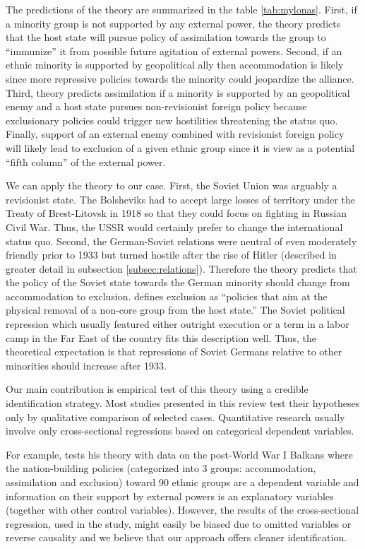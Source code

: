 The predictions of the theory are summarized in the table \ref{tab:mylonas}. First, if a minority group is not supported by any external power, the theory predicts that the host state will pursue policy of assimilation towards the group to \enquote{immunize} it from possible future  agitation  of external powers. Second, if an ethnic minority is supported by geopolitical ally then accommodation is likely since more repressive policies towards the minority could jeopardize the alliance. Third, theory predicts assimilation if a minority is supported by an geopolitical enemy and a host state pursues non-revisionist foreign policy because exclusionary policies could trigger new hostilities threatening the status quo. 
Finally, support of an external enemy combined with revisionist foreign policy will likely lead to exclusion of a given ethnic group since it is view as a potential \enquote{fifth column} of the external power. 



We can apply the theory to our case. First, the Soviet Union was arguably a revisionist state. The Bolsheviks had to accept large losses of territory under the Treaty of Brest-Litovsk in 1918 so that they could focus on fighting in Russian Civil War. Thus, the USSR would certainly prefer to change the international status quo. Second, the German-Soviet relations were neutral of even moderately friendly prior to 1933 but turned hostile after the rise of Hitler (described in greater detail in subsection \ref{subsec:relations}). Therefore the theory predicts that the policy 
of the Soviet state towards the German minority should change from accommodation to exclusion. \citet[p. 22]{mylonas_politics_2013} defines exclusion as \enquote{policies that aim at the physical removal of a non-core group from the host state.} The Soviet political repression which usually featured either outright execution or a term in a labor camp in the Far East of the country fits this description well. Thus, the theoretical expectation is that  repressions of Soviet Germans relative to other minorities should increase after 1933. 

Our main contribution is empirical test of this theory using a credible identification strategy. Most studies presented in this review test their hypotheses only by qualitative comparison of selected cases. Quantitative research usually involve only cross-sectional regressions based on categorical dependent variables.    

For example, \citet{mylonas_politics_2013} tests his theory with data on the post-World War I Balkans where the nation-building policies (categorized into 3 groups: accommodation, assimilation and exclusion)  toward  90 ethnic groups are a dependent variable and information on their support by external powers is an explanatory variables (together with other control variables). However, the results of the cross-sectional regression, used in the study, might easily be biased due to omitted variables or reverse causality and we believe that our approach offers cleaner identification.

